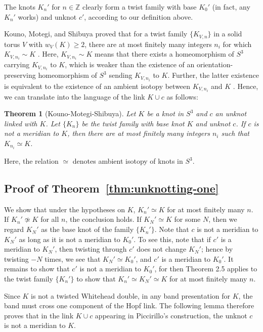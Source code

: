 \documentclass[11pt,usenames,dvipsnames,reqno]{amsart}
\newtheorem{theorem}{Theorem}
\numberwithin{theorem}{section}
\theoremstyle{ex}
\theoremstyle{rem}
\begin{document}
The knots $K_n'$ for $n \in \mathbb{Z}$ clearly form a twist family with base $K_0'$ (in fact, any $K_n'$ works) and unknot $c'$, according to our definition above. 

Kouno, Motegi, and Shibuya proved that for a twist family $\{K_{V,n}\}$ in a solid torus $V$ with $w_V(K)\geq 2$, there are at most finitely many integers $n_i$ for which $K_{V,n_i}\sim K$  \cite[Theorem 3.2]{twisting-knot-types}. Here, $K_{V,n_i}\sim K$ means that there exists a homeomorphism of $S^3$ carrying $K_{V,n_i}$ to $K$, which is weaker than the existence of an orientation-preserving homeomorphism of $S^3$ sending $K_{V,n_i}$ to $K$. Further, the latter existence is equivalent to the existence of an ambient isotopy between $K_{V,n_i}$ and $K$ \cite[Introduction]{twisting-knot-types}. Hence, we can translate \cite[Theorem 3.2]{twisting-knot-types} into the language of the link $K\cup c$ as follows:


\begin{theorem}[Kouno-Motegi-Shibuya] Let $K$ be a knot in $S^3$ and $c$ an unknot linked with $K$. Let $\{K_n\}$ be the twist family with base knot $K$ and unknot $c$. If $c$ is not a meridian to $K$, then there are at most finitely many integers $n_i$ such that $K_{n_i}\simeq K$. 
\end{theorem}

Here, the relation $\simeq$ denotes ambient isotopy of knots in $S^3$.

\subsection{Proof of Theorem~\ref{thm:unknotting-one}} We show that under the hypotheses on $K$, $K_n'\simeq K$ for at most finitely many $n$. If $K_n'\not\simeq K$ for all $n$, the conclusion holds. If $K_N'\simeq K$ for some $N$, then we regard $K_N'$ as the base knot of the family $\{K_n'\}$. Note that $c$ is not a meridian to $K_N'$ as long as it is not a meridian to $K_0'$. To see this, note that if $c'$ is a meridian to $K_N'$, then twisting through $c'$ does not change $K_N'$; hence by twisting $-N$ times, we see that $K_N'\simeq K_0'$, and $c'$ is a meridian to $K_0'$. It remains to show that $c'$ is not a meridian to $K_0'$, for then Theorem 2.5 applies to the twist family $\{K_n'\}$ to show that $K_n'\simeq K_N'\simeq K$ for at most finitely many $n$. 

Since $K$ is not a twisted Whitehead double, in any band presentation for $K$, the band must cross one component of the Hopf link. The following lemma therefore proves that in the link $K\cup c$ appearing in Piccirillo's construction, the unknot $c$ is not a meridian to $K$.
\end{document}
